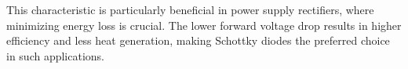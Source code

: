 This characteristic is particularly beneficial in power supply rectifiers, where minimizing energy loss is crucial. The lower forward voltage drop results in higher efficiency and less heat generation, making Schottky diodes the preferred choice in such applications.


